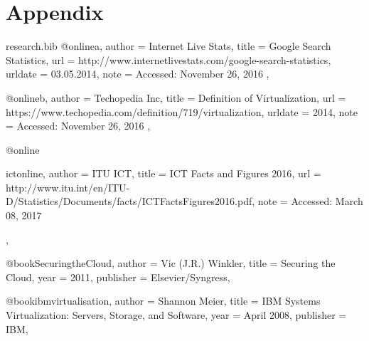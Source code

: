 \documentclass{article}
\begin{document}
  \section{Appendix}

	

	\begin{filecontents*}{research.bib}
		@online{a,
			author = {Internet Live Stats},
			title = {Google Search Statistics},
			url = {http://www.internetlivestats.com/google-search-statistics},
			urldate = {03.05.2014},
			note = {Accessed: November 26, 2016}
		},
	
		@online{b,
			author = {Techopedia Inc},
			title = {Definition of Virtualization},
			url = {https://www.techopedia.com/definition/719/virtualization},
			urldate = {2014},
			note = {Accessed: November 26, 2016}
		},
	
		@online{ictonline,
			author = {ITU ICT},
			title = {ICT Facts and Figures 2016},
			url = {http://www.itu.int/en/ITU-D/Statistics/Documents/facts/ICTFactsFigures2016.pdf},
			note = {Accessed: March 08, 2017}

		},
	
		@book{SecuringtheCloud,
			author    = {Vic (J.R.) Winkler},
			title     = {Securing the Cloud},
			year      = {2011},
			publisher = {Elsevier/Syngress},
		}
	
		@book{ibmvirtualisation,
			author    = {Shannon Meier},
			title     = {IBM Systems Virtualization: Servers, Storage, and Software},
			year      = {April 2008},
			publisher = {IBM},
		}

		
	\end{filecontents*}

	
\end{document}
